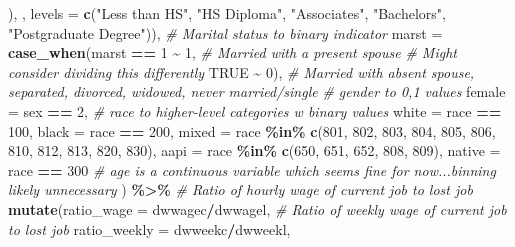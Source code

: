 \documentclass[
]{article}
\newenvironment{Shaded}{\begin{snugshade}}{\end{snugshade}}
\newcommand{\AttributeTok}[1]{\textcolor[rgb]{0.13,0.29,0.53}{#1}}
\newcommand{\CommentTok}[1]{\textcolor[rgb]{0.56,0.35,0.01}{\textit{#1}}}
\newcommand{\ConstantTok}[1]{\textcolor[rgb]{0.56,0.35,0.01}{#1}}
\newcommand{\DecValTok}[1]{\textcolor[rgb]{0.00,0.00,0.81}{#1}}
\newcommand{\FunctionTok}[1]{\textcolor[rgb]{0.13,0.29,0.53}{\textbf{#1}}}
\newcommand{\NormalTok}[1]{#1}
\newcommand{\SpecialCharTok}[1]{\textcolor[rgb]{0.81,0.36,0.00}{\textbf{#1}}}
\newcommand{\StringTok}[1]{\textcolor[rgb]{0.31,0.60,0.02}{#1}}
\begin{document}
\begin{Shaded}
\begin{Highlighting}[]
\NormalTok{                              ), , }\AttributeTok{levels =} \FunctionTok{c}\NormalTok{(}\StringTok{"Less than HS"}\NormalTok{, }\StringTok{"HS Diploma"}\NormalTok{, }\StringTok{"Associate\textquotesingle{}s"}\NormalTok{, }\StringTok{"Bachelor\textquotesingle{}s"}\NormalTok{, }\StringTok{"Postgraduate Degree"}\NormalTok{)),}
         \CommentTok{\# Marital status to binary indicator}
         \AttributeTok{marst =} \FunctionTok{case\_when}\NormalTok{(marst }\SpecialCharTok{==} \DecValTok{1} \SpecialCharTok{\textasciitilde{}} \DecValTok{1}\NormalTok{, }\CommentTok{\# Married with a present spouse}
                           \CommentTok{\# Might consider dividing this differently}
                           \ConstantTok{TRUE} \SpecialCharTok{\textasciitilde{}} \DecValTok{0}\NormalTok{), }\CommentTok{\# Married with absent spouse, separated, divorced, widowed, never married/single}
         \CommentTok{\# gender to 0,1 values}
         \AttributeTok{female =}\NormalTok{ sex }\SpecialCharTok{==} \DecValTok{2}\NormalTok{,}
         \CommentTok{\# race to higher{-}level categories w binary values}
         \AttributeTok{white =}\NormalTok{ race }\SpecialCharTok{==} \DecValTok{100}\NormalTok{,}
         \AttributeTok{black =}\NormalTok{ race }\SpecialCharTok{==} \DecValTok{200}\NormalTok{,}
         \AttributeTok{mixed =}\NormalTok{ race }\SpecialCharTok{\%in\%} \FunctionTok{c}\NormalTok{(}\DecValTok{801}\NormalTok{, }\DecValTok{802}\NormalTok{, }\DecValTok{803}\NormalTok{, }\DecValTok{804}\NormalTok{, }\DecValTok{805}\NormalTok{, }\DecValTok{806}\NormalTok{, }\DecValTok{810}\NormalTok{, }\DecValTok{812}\NormalTok{, }\DecValTok{813}\NormalTok{, }\DecValTok{820}\NormalTok{, }\DecValTok{830}\NormalTok{),}
         \AttributeTok{aapi =}\NormalTok{ race }\SpecialCharTok{\%in\%} \FunctionTok{c}\NormalTok{(}\DecValTok{650}\NormalTok{, }\DecValTok{651}\NormalTok{, }\DecValTok{652}\NormalTok{, }\DecValTok{808}\NormalTok{, }\DecValTok{809}\NormalTok{),}
         \AttributeTok{native =}\NormalTok{ race }\SpecialCharTok{==} \DecValTok{300}
         \CommentTok{\# age is a continuous variable which seems fine for now...binning likely unnecessary}
\NormalTok{         ) }\SpecialCharTok{\%\textgreater{}\%} 
        \CommentTok{\# Ratio of hourly wage of current job to lost job}
  \FunctionTok{mutate}\NormalTok{(}\AttributeTok{ratio\_wage =}\NormalTok{ dwwagec}\SpecialCharTok{/}\NormalTok{dwwagel,}
         \CommentTok{\# Ratio of weekly wage of current job to lost job}
         \AttributeTok{ratio\_weekly =}\NormalTok{ dwweekc}\SpecialCharTok{/}\NormalTok{dwweekl,}

\end{Highlighting}
\end{Shaded}
\end{document}
